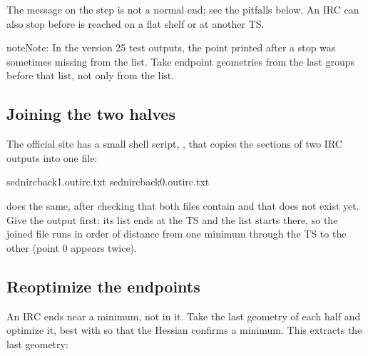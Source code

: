 \documentclass[letterpaper,10pt,english,openany,oneside]{sphinxmanual}
\begin{document}
\sphinxAtStartPar
The  message on the  step is not a normal end; see the pitfalls below. An IRC can also stop
before  is reached on a flat shelf or at another TS.



\begin{sphinxadmonition}{note}{Note:}
\sphinxAtStartPar
In the version 25 test outputs, the point printed after a  stop was sometimes missing from the
 list. Take endpoint geometries from the last  groups before that list, not only from the list.
\end{sphinxadmonition}




\subsection{Joining the two halves}
\label{\detokenize{tasks/ts-irc-scan:joining-the-two-halves}}
\sphinxAtStartPar
The official site has a small shell script, , that copies the  sections of two IRC outputs
into one file:

\begin{sphinxVerbatim}[commandchars=\\\{\}]
sed\PYGZhy{}nirc\PYGZus{}back1.out\PYGZgt{}irc.txt
sed\PYGZhy{}nirc\PYGZus{}back0.out\PYGZgt{}\PYGZgt{}irc.txt
\end{sphinxVerbatim}



\sphinxAtStartPar
{} does the same, after checking that both files contain 
and that  does not exist yet. Give the  output first: its list ends at the TS and the 
list starts there, so the joined file runs in order of distance from one minimum through the TS to the other
(point 0 appears twice).




\subsection{Re\sphinxhyphen{}optimize the endpoints}
\label{\detokenize{tasks/ts-irc-scan:re-optimize-the-endpoints}}
\sphinxAtStartPar
An IRC ends near a minimum, not in it. Take the last  geometry of each half and optimize it, best with
 so that the Hessian confirms a minimum. This extracts the last geometry:
\end{document}
